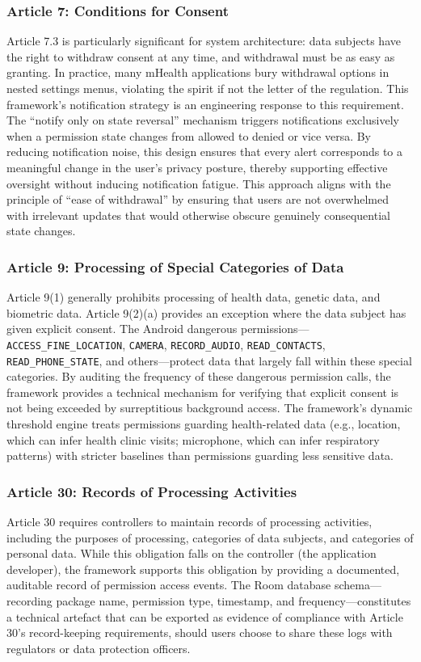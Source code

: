 \subsubsection{Article 7: Conditions for Consent}
Article 7.3 is particularly significant for system architecture: data subjects have the right to withdraw consent at any time, and withdrawal must be as easy as granting. In practice, many mHealth applications bury withdrawal options in nested settings menus, violating the spirit if not the letter of the regulation. This framework's notification strategy is an engineering response to this requirement. The ``notify only on state reversal'' mechanism triggers notifications exclusively when a permission state changes from allowed to denied or vice versa. By reducing notification noise, this design ensures that every alert corresponds to a meaningful change in the user's privacy posture, thereby supporting effective oversight without inducing notification fatigue. This approach aligns with the principle of ``ease of withdrawal'' by ensuring that users are not overwhelmed with irrelevant updates that would otherwise obscure genuinely consequential state changes.

\subsubsection{Article 9: Processing of Special Categories of Data}
Article 9(1) generally prohibits processing of health data, genetic data, and biometric data. Article 9(2)(a) provides an exception where the data subject has given explicit consent. The Android dangerous permissions—\texttt{ACCESS\_FINE\_LOCATION}, \texttt{CAMERA}, \texttt{RECORD\_AUDIO}, \texttt{READ\_CONTACTS}, \texttt{READ\_PHONE\_STATE}, and others—protect data that largely fall within these special categories. By auditing the frequency of these dangerous permission calls, the framework provides a technical mechanism for verifying that explicit consent is not being exceeded by surreptitious background access. The framework's dynamic threshold engine treats permissions guarding health-related data (e.g., location, which can infer health clinic visits; microphone, which can infer respiratory patterns) with stricter baselines than permissions guarding less sensitive data.

\subsubsection{Article 30: Records of Processing Activities}
Article 30 requires controllers to maintain records of processing activities, including the purposes of processing, categories of data subjects, and categories of personal data. While this obligation falls on the controller (the application developer), the framework supports this obligation by providing a documented, auditable record of permission access events. The Room database schema—recording package name, permission type, timestamp, and frequency—constitutes a technical artefact that can be exported as evidence of compliance with Article 30's record-keeping requirements, should users choose to share these logs with regulators or data protection officers.

